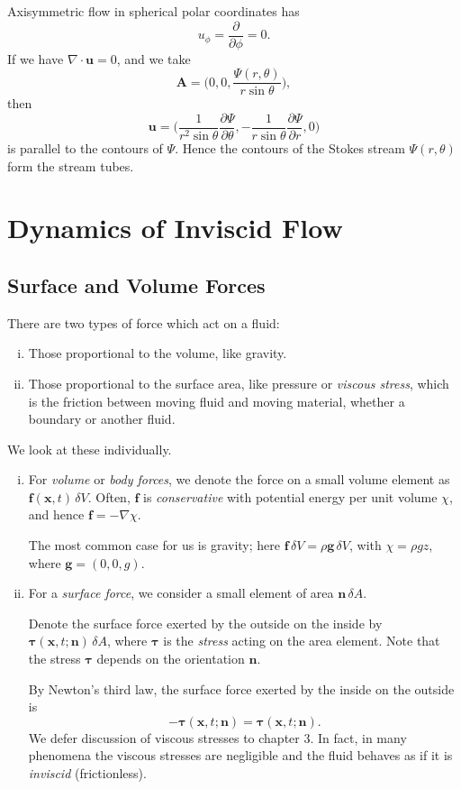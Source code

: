 \documentclass[12pt]{article}
\begin{document}
Axisymmetric flow in spherical polar coordinates has
\[
u_{\phi} = \frac{\partial}{\partial \phi} = 0
.\]
If we have $\nabla \cdot \mathbf{u} = 0$, and we take
\[
\mathbf{A} = \biggl( 0, 0, \frac{\Psi(r, \theta)}{r \sin \theta} \biggr)
,\]
then
\[
\mathbf{u} = \biggl( \frac{1}{r^2 \sin \theta} \frac{\partial \Psi}{\partial \theta}, - \frac{1}{r \sin \theta} \frac{\partial \Psi}{\partial r}, 0 \biggr)
\]
is parallel to the contours of $\Psi$. Hence the contours of the Stokes stream $\Psi(r, \theta)$ form the stream tubes.

\newpage

\section{Dynamics of Inviscid Flow}
\label{sec:dynamics_of_inviscid_flow}

\subsection{Surface and Volume Forces}
\label{sub:surface_and_volume_forces}

There are two types of force which act on a fluid:
\begin{enumerate}[(i)]
	\item Those proportional to the volume, like gravity.
	\item Those proportional to the surface area, like pressure or \emph{viscous stress}, which is the friction between moving fluid and moving material, whether a boundary or another fluid.
\end{enumerate}
We look at these individually.

\begin{enumerate}[(i)]
	\item For \emph{volume} or \emph{body forces}, we denote the force on a small volume element as $\mathbf{f}(\mathbf{x},t)\, \delta V$. Often, $\mathbf{f}$ is \emph{conservative} with potential energy per unit volume $\chi$, and hence $\mathbf{f} = - \nabla \chi$.

		The most common case for us is gravity; here $\mathbf{f} \, \delta V = \rho \mathbf{g} \, \delta V$, with $\chi = \rho g z$, where $\mathbf{g} = (0, 0, g)$.
	\item For a \emph{surface force}, we consider a small element of area $\mathbf{n} \, \delta A$.

		Denote the surface force exerted by the outside on the inside by $\bm{\tau}(\mathbf{x}, t ; \mathbf{n}) \, \delta A$, where $\bm{\tau}$ is the \emph{stress} acting on the area element. Note that the stress $\bm{\tau}$ depends on the orientation $\mathbf{n}$.

		By Newton's third law, the surface force exerted by the inside on the outside is
		\[
		- \bm{\tau}(\mathbf{x}, t;\mathbf{n}) = \bm{\tau}(\mathbf{x}, t; \mathbf{n})
		.\]
		We defer discussion of viscous stresses to chapter 3. In fact, in many phenomena the viscous stresses are negligible and the fluid behaves as if it is \emph{inviscid} (frictionless).
\end{enumerate}
\end{document}
